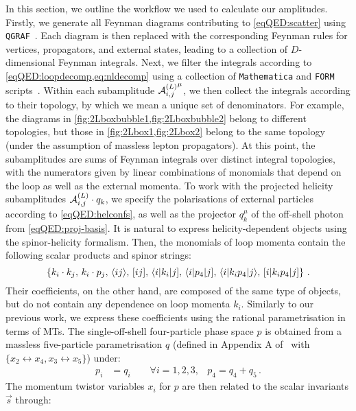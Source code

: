 \documentclass[main.tex]{subfiles}
\begin{document}
In this section, we outline the workflow we used to calculate our amplitudes.
Firstly, we generate all Feynman diagrams contributing to \cref{eqQED:scatter}
using \texttt{QGRAF}~\cite{Nogueira:1991ex}. Each diagram is then replaced with
the corresponding Feynman rules for vertices, propagators, and external states,
leading to a collection of $D$-dimensional Feynman integrals. Next, we filter
the integrals according to \cref{eqQED:loopdecomp,eq:nldecomp} using a collection
of \texttt{Mathematica} and \texttt{FORM} scripts~\cite{Kuipers:2012rf,
Ruijl:2017dtg}. Within each subamplitude ${\mathcal{A}^{(L)}_{i, j}}^{\mu}$, we then collect the
integrals according to their topology, by which we mean a unique set of
denominators. For example, the diagrams in
\cref{fig:2Lboxbubble1,fig:2Lboxbubble2} belong to different topologies, but
those in \cref{fig:2Lbox1,fig:2Lbox2} belong to the same topology (under the
assumption of massless lepton propagators). At this point, the subamplitudes
are sums of Feynman integrals over distinct integral topologies, with the
numerators given by linear combinations of monomials that depend on the loop as
well as the external momenta. To work with the projected helicity subamplitudes
$\mathcal{A}^{(L)}_{i,j}\cdot q_k$, we specify the polarisations of external particles
according to \cref{eqQED:helconfs}, as well as the projector $q_k^\mu$ of the
off-shell photon from \cref{eqQED:proj-basis}. It is natural to express
helicity-dependent objects using the spinor-helicity formalism. Then, the
monomials of loop momenta contain the following scalar products and spinor
strings:
\begin{equation} \label{eqQED:loopmomobjects}
	\left\{ k_i \cdot k_j, \,
    k_i \cdot p_j ,\,
    \langle ij \rangle,\,
    [ ij ],\,
    \langle i |k_i |j],\,
    \langle i |p_4 |j],\,
    \langle i|k_i p_4|j \rangle,\,
    [i| k_i p_4 |j] \right\} \,.
\end{equation}
Their coefficients, on the other hand, are composed of the same type of
objects, but do not contain any dependence on loop momenta $k_i$.  Similarly to our previous work, we express these coefficients using the rational parametrisation in terms of MTs. The single-off-shell four-particle phase space $p$ is obtained from a massless five-particle parametrisation $q$ (defined in Appendix A of~ with $\{x_2\leftrightarrow x_4,x_3\leftrightarrow x_5\}$) under:
\begin{align}
    p_i &= q_i \qquad \forall i=1,2,3, & p_4=q_4+q_5 \, .
\end{align}
The momentum twistor variables $x_i$ for $p$ are then related to the scalar invariants $\vec{s}$ through:
\end{document}

